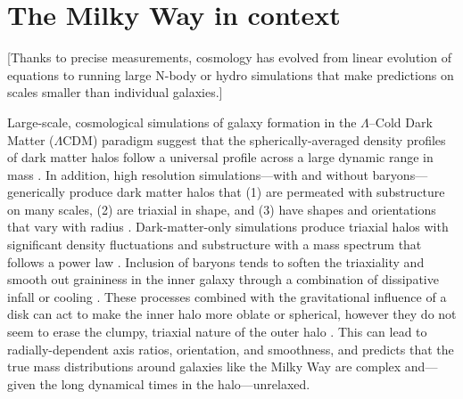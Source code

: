 

\section{The Milky Way in context}\label{sec:milkyway-context}

[Thanks to precise measurements, cosmology has evolved from linear evolution of equations to running large N-body or hydro simulations that make predictions on scales smaller than individual galaxies.]

Large-scale, cosmological simulations of galaxy formation in the $\Lambda$--Cold Dark Matter ($\Lambda$CDM) paradigm suggest that the spherically-averaged density profiles of dark matter halos follow a universal profile across a large dynamic range in mass \citep{navarro96}. In addition, high resolution simulations---with and without baryons---generically produce dark matter halos that (1) are permeated with substructure on many scales, (2) are triaxial in shape, and (3) have shapes and orientations that vary with radius \citep{dubinski91, jing02, kuhlen07, veraciro11}. Dark-matter-only simulations produce triaxial halos \citep{jing02} with significant density fluctuations and substructure with a mass spectrum that follows a power law \citep{zemp09}. Inclusion of baryons tends to soften the triaxiality and smooth out graininess in the inner galaxy through a combination of dissipative infall \citep{dubinski94} or cooling \citep{bryan13}. These processes combined with the gravitational influence of a disk can act to make the inner halo more oblate or spherical, however they do not seem to erase the clumpy, triaxial nature of the outer halo \citep[e.g.,][]{pontzen12, zhu15}. This can lead to radially-dependent axis ratios, orientation, and smoothness, and predicts that the true mass distributions around galaxies like the Milky Way are complex and---given the long dynamical times in the halo---unrelaxed. 

